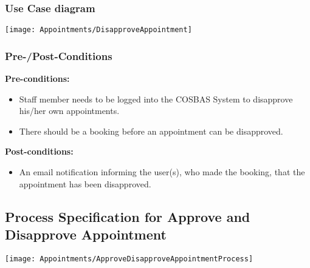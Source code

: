 \subsubsection{Use Case diagram}
\texttt{[image: Appointments/DisapproveAppointment]}

\subsubsection{Pre-/Post-Conditions}\textbf{Pre-conditions:} 
	\begin{itemize}
		\item Staff member needs to be logged into the COSBAS System to disapprove his/her own appointments.
		\item There should be a booking before an appointment can be disapproved.
	\end{itemize}
\textbf{ Post-conditions:} 
	\begin{itemize}
		\item An email notification informing the user(s), who made the booking, that the appointment has been disapproved.
	\end{itemize}	

\subsection{Process Specification for Approve and Disapprove Appointment}
	\texttt{[image: Appointments/ApproveDisapproveAppointmentProcess]}	